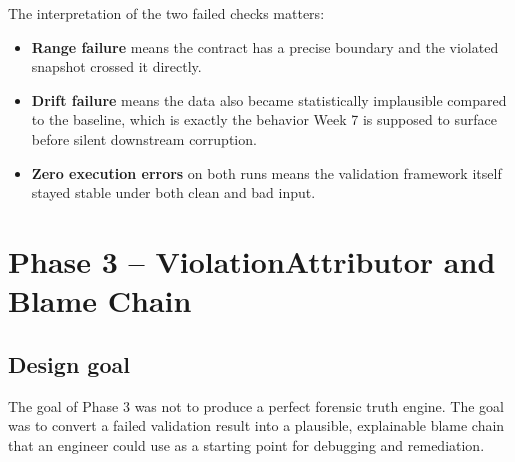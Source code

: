 \documentclass[11pt]{report}
\begin{document}
The interpretation of the two failed checks matters:

\begin{itemize}[leftmargin=1.5em]
  \item \textbf{Range failure} means the contract has a precise boundary and the violated snapshot crossed it directly.
  \item \textbf{Drift failure} means the data also became statistically implausible compared to the baseline, which is exactly the behavior Week 7 is supposed to surface before silent downstream corruption.
  \item \textbf{Zero execution errors} on both runs means the validation framework itself stayed stable under both clean and bad input.
\end{itemize}

\clearpage
\chapter{Phase 3 -- ViolationAttributor and Blame Chain}

\section{Design goal}
The goal of Phase 3 was not to produce a perfect forensic truth engine. The goal was to convert a failed validation result into a plausible, explainable blame chain that an engineer could use as a starting point for debugging and remediation.
\end{document}

